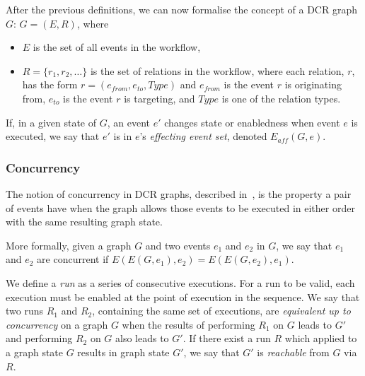 \documentclass{article}
\begin{document}
			After the previous definitions, we can now formalise the concept of a DCR graph $G$:
			$G = (E,R)$, where
			\begin{itemize}
				\item $E$ is the set of all events in the workflow,
				\item $R = \{r_1, r_2, \dots\}$ is the set of relations in the workflow, where each relation, $r$, has the form $r=(e_{from}, e_{to}, Type)$ and $e_{from}$ is the event $r$ is originating from, $e_{to}$ is the event $r$ is targeting, and $Type$ is one of the relation types.
			\end{itemize}

			If, in a given state of $G$, an event $e'$ changes state or enabledness when event $e$ is executed, we say that $e'$ is in $e$'s \textit{effecting event set}, denoted $E_{aff}(G,e)$.

			\subsubsection{Concurrency}
			\label{subsubsec:concurrency}

			The notion of concurrency in DCR graphs, described in~\cite{debois_concurrency_2015}, is the property a pair of events have when the graph allows those events to be executed in either order with the same resulting graph state.

			More formally, given a graph $G$ and two events $e_1$ and $e_2$ in $G$, we say that $e_1$ and $e_2$ are concurrent if $E(E(G, e_1),e_2)=E(E(G, e_2),e_1)$.

			We define a \textit{run} as a series of consecutive executions.
			For a run to be valid, each execution must be enabled at the point of execution in the sequence.
			We say that two runs $R_1$ and $R_2$, containing the same set of executions, are \textit{equivalent up to concurrency} on a graph $G$ when the results of performing $R_1$ on $G$ leads to $G'$ and performing $R_2$ on $G$ also leads to $G'$.
			If there exist a run $R$ which applied to a graph state $G$ results in graph state $G'$, we say that $G'$ is \textit{reachable} from $G$ via $R$.
\end{document}
